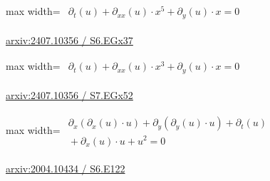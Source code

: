\documentclass[10pt,a4paper]{article}
\begin{document}
\begin{minipage}{\linewidth}
\begin{center}\begin{adjustbox}{max width=\linewidth}$\displaystyle\begin{gathered}\begin{gathered}\partial_{t}(u)+\partial_{xx}(u)\cdot x^{5}+\partial_{y}(u)\cdot x=0\end{gathered}\end{gathered}$\end{adjustbox}\end{center}
{\small \href{https://arxiv.org/html/2407.10356#S6.EGx37}{arxiv:2407.10356 / S6.EGx37}}\par
\end{minipage}\par\vspace{7mm}

\begin{minipage}{\linewidth}
\begin{center}\begin{adjustbox}{max width=\linewidth}$\displaystyle\begin{gathered}\begin{gathered}\partial_{t}(u)+\partial_{xx}(u)\cdot x^{3}+\partial_{y}(u)\cdot x=0\end{gathered}\end{gathered}$\end{adjustbox}\end{center}
{\small \href{https://arxiv.org/html/2407.10356#S7.EGx52}{arxiv:2407.10356 / S7.EGx52}}\par
\end{minipage}\par\vspace{7mm}

\begin{minipage}{\linewidth}
\begin{center}\begin{adjustbox}{max width=\linewidth}$\displaystyle\begin{gathered}\begin{gathered}\partial_{x}(\partial_{x}(u)\cdot u)+\partial_{y}(\partial_{y}(u)\cdot u)+\partial_{t}(u)\\[-1pt]{}+\partial_{x}(u)\cdot u+u^{2}=0\end{gathered}\end{gathered}$\end{adjustbox}\end{center}
{\small \href{https://arxiv.org/html/2004.10434#S6.E122}{arxiv:2004.10434 / S6.E122}}\par
\end{minipage}\par\vspace{7mm}
\end{document}

